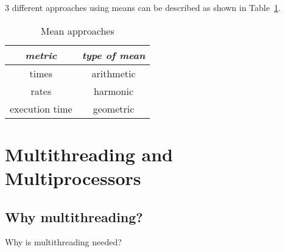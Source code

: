 \documentclass[english]{article}
\begin{document}
\(3\) different approaches using means can be described as shown in Table~\ref{tab:mean-approaches}.

\begin{table}[htbp]
  \centering
  \begin{tabular}{c|c}
    \textit{metric} & \textit{type of mean} \\ \hline
    times           & arithmetic            \\
    rates           & harmonic              \\
    execution time  & geometric             \\
  \end{tabular}
  \caption{Mean approaches}
  \label{tab:mean-approaches}
\end{table}

\newpage

\section{Multithreading and Multiprocessors}

\subsection{Why multithreading?}

Why is multithreading needed?
\end{document}
